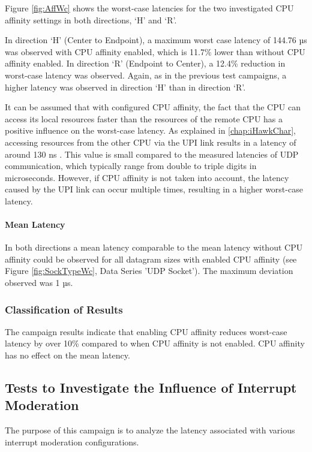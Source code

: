Figure \ref{fig:AffWc} shows the worst-case latencies for the two investigated CPU affinity settings in both directions, `H' and `R'.

In direction `H' (Center to Endpoint), a maximum worst case latency of 144.76 µs was observed with CPU affinity enabled, which is 11.7\% lower than without CPU affinity enabled. In direction `R' (Endpoint to Center), a 12.4\% reduction in worst-case latency was observed. Again, as in the previous test campaigns, a higher latency was observed in direction `H' than in direction `R'.

It can be assumed that with configured CPU affinity, the fact that the CPU can access its local resources faster than the resources of the remote CPU has a positive influence on the worst-case latency. As explained in \ref{chap:iHawkChar}, accessing resources from the other CPU via the UPI link results in a latency of around 130 ns \cite{setup07}. This value is small compared to the measured latencies of UDP communication, which typically range from double to triple digits in microseconds. However, if CPU affinity is not taken into account, the latency caused by the UPI link can occur multiple times, resulting in a higher worst-case latency.

\paragraph{Mean Latency}

In both directions a mean latency comparable to the mean latency without CPU affinity could be observed for all datagram sizes with enabled CPU affinity (see Figure \ref{fig:SockTypeWc}, Data Series 'UDP Socket'). The maximum deviation observed was 1 µs.

\subsubsection{Classification of Results}
The campaign results indicate that enabling CPU affinity reduces worst-case latency by over 10\% compared to when CPU affinity is not enabled. CPU affinity has no effect on the mean latency.

\subsection{Tests to Investigate the Influence of Interrupt Moderation}
The purpose of this campaign is to analyze the latency associated with various interrupt moderation configurations.

